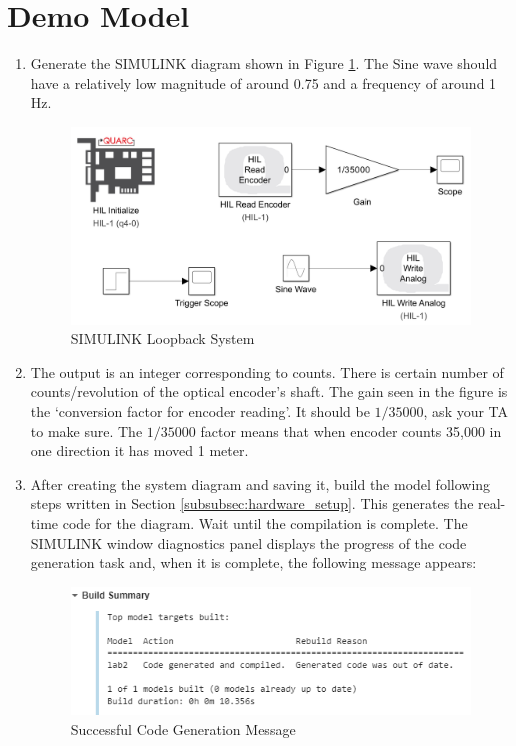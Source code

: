 \documentclass[11pt,letterpaper]{article}
\begin{document}
\section{Demo Model}
\begin{enumerate}
  \item Generate the SIMULINK diagram shown in Figure \ref{fig:simulink_loopback}. The Sine wave should have a relatively low magnitude of around 0.75 and a frequency of around 1 Hz.
  \begin{figure}[H]
    \centering 
    \includegraphics[width=.75\textwidth]{Figures/fig10_loopback.png}
    \caption{SIMULINK Loopback System}
    \label{fig:simulink_loopback}
  \end{figure} 
  \item The output is an integer corresponding to counts. There is certain number of counts/revolution of the optical encoder's shaft. The gain seen in the figure is the `conversion factor for encoder reading'. It should be $1/35000$, ask your TA to make sure. The $1/35000$ factor means that when encoder counts 35,000 in one direction it has moved 1 meter. 
  \item After creating the system diagram and saving it, build the model following steps written in Section \ref{subsubsec:hardware_setup}. This generates the real-time code for the diagram. Wait until the compilation is complete. The SIMULINK window diagnostics panel displays the progress of the code generation task and, when it is complete, the following message appears:
  \begin{figure}[H]
    \centering 
    \includegraphics[width=.6\textwidth]{Figures/codegen_message.png}
    \caption{Successful Code Generation Message}
    \label{fig:build_success}
  \end{figure}

\end{enumerate}
\end{document}
